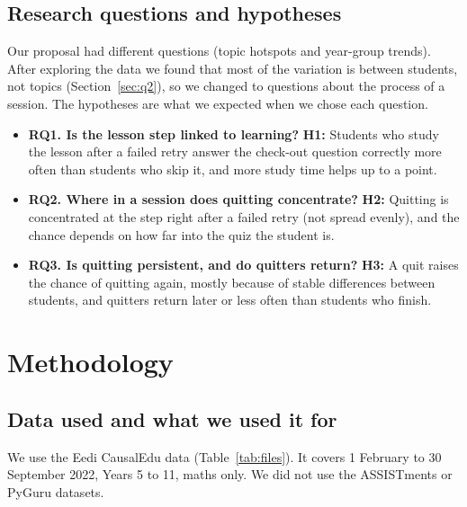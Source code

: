\documentclass[11pt,a4paper]{article}
\begin{document}
\subsection{Research questions and hypotheses}
Our proposal had different questions (topic hotspots and year-group trends). After exploring the data we found that most of the variation is between students, not topics (Section~\ref{sec:q2}), so we changed to questions about the process of a session. The hypotheses are what we expected when we chose each question.
\begin{itemize}
\item \textbf{RQ1. Is the lesson step linked to learning?} \textbf{H1:} Students who study the lesson after a failed retry answer the check-out question correctly more often than students who skip it, and more study time helps up to a point.
\item \textbf{RQ2. Where in a session does quitting concentrate?} \textbf{H2:} Quitting is concentrated at the step right after a failed retry (not spread evenly), and the chance depends on how far into the quiz the student is.
\item \textbf{RQ3. Is quitting persistent, and do quitters return?} \textbf{H3:} A quit raises the chance of quitting again, mostly because of stable differences between students, and quitters return later or less often than students who finish.
\end{itemize}

\section{Methodology}
\subsection{Data used and what we used it for}
We use the Eedi CausalEdu data (Table~\ref{tab:files}). It covers 1 February to 30 September 2022, Years 5 to 11, maths only. We did not use the ASSISTments or PyGuru datasets.
\end{document}
